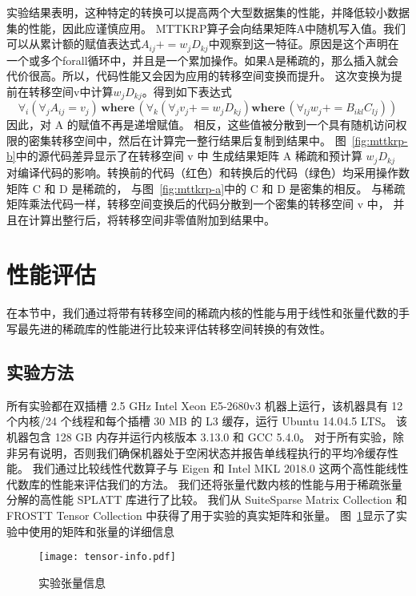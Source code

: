\begin{translation}
实验结果表明，这种特定的转换可以提高两个大型数据集的性能，并降低较小数据集的性能，因此应谨慎应用。
MTTKRP算子会向结果矩阵A中随机写入值。我们可以从累计额的赋值表达式$A_{ij}+=w_j D_{kj}$中观察到这一特征。原因是这个声明在一个或多个forall循环中，并且是一个累加操作。如果A是稀疏的，那么插入就会代价很高。所以，代码性能又会因为应用的转移空间变换而提升。
这次变换为提前在转移空间v中计算$w_jD_{kj}$。得到如下表达式
\begin{equation*}
  \forall_{i} (\forall_j A_{ij}=v_{j})\, \mathbf{where}\, (\forall_k(\forall_j v_j += w_j D_{kj})\mathbf{where}\, (\forall_{lj} w_j +=B_{ikl}C_{lj}))
\end{equation*}
因此，对 A 的赋值不再是递增赋值。 相反，这些值被分散到一个具有随机访问权限的密集转移空间中，然后在计算完一整行结果后复制到结果中。 图~\ref{fig:mttkrp-b}中的源代码差异显示了在转移空间 v 中
生成结果矩阵 A 稀疏和预计算 $w_jD_{kj}$ 对编译代码的影响。转换前的代码（红色）和转换后的代码（绿色）均采用操作数矩阵 C 和 D 是稀疏的，
与图~\ref{fig:mttkrp-a}中的 C 和 D 是密集的相反。 与稀疏矩阵乘法代码一样，转移空间变换后的代码分散到一个密集的转移空间 v 中，
并且在计算出整行后，将转移空间非零值附加到结果中。

\section{性能评估}
在本节中，我们通过将带有转移空间的稀疏内核的性能与用于线性和张量代数的手写最先进的稀疏库的性能进行比较来评估转移空间转换的有效性。
\subsection{实验方法}
所有实验都在双插槽 2.5 GHz Intel Xeon E5-2680v3 机器上运行，该机器具有 12 个内核/24 个线程和每个插槽 30 MB 的 L3 缓存，运行 Ubuntu 14.04.5 LTS。 该机器包含 128 GB 内存并运行内核版本 3.13.0 和 GCC 5.4.0。 对于所有实验，除非另有说明，否则我们确保机器处于空闲状态并报告单线程执行的平均冷缓存性能。
我们通过比较线性代数算子与 Eigen 和 Intel MKL 2018.0 这两个高性能线性代数库的性能来评估我们的方法。 我们还将张量代数内核的性能与用于稀疏张量分解的高性能 SPLATT 库进行了比较。 我们从 SuiteSparse Matrix Collection 和 FROSTT Tensor Collection 中获得了用于实验的真实矩阵和张量。 图~\ref{fig:tensor-info}显示了实验中使用的矩阵和张量的详细信息
\begin{figure}
  \centering
  \texttt{[image: tensor-info.pdf]}
  \caption{实验张量信息}
  \label{fig:tensor-info}
\end{figure}

\end{translation}
